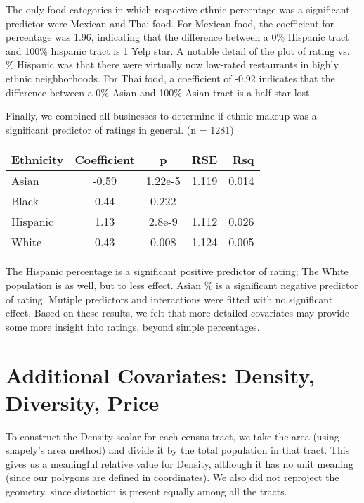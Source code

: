 \documentclass[11pt,twocolumn]{article}
\begin{document}
The only food categories in which respective ethnic percentage was a significant predictor were Mexican and Thai food. For Mexican food, the coefficient for percentage was 1.96, indicating that the difference between a 0\% Hispanic tract and 100\% hispanic tract is 1 Yelp star. A notable detail of the plot of rating vs. \% Hispanic was that there were virtually now low-rated restaurants in highly ethnic neighborhoods. For Thai food, a coefficient of -0.92 indicates that the difference between a 0\% Asian and 100\% Asian tract is a half star lost.

Finally, we combined all businesses to determine if ethnic makeup was a significant predictor of ratings in general. (n = 1281)

\begin{center}
  \begin{tabular}{| l | c | c | c | r | }
    \hline
    Ethnicity & Coefficient & p & RSE & Rsq \\ \hline \hline
    Asian & -0.59 & 1.22e-5 & 1.119 & 0.014 \\ \hline
    Black & 0.44 & 0.222 & - & - \\ \hline
    Hispanic & 1.13 & 2.8e-9 & 1.112 & 0.026 \\ \hline
    White & 0.43 & 0.008 & 1.124 & 0.005 \\ \hline
  \end{tabular}
\end{center}

The Hispanic percentage is a significant positive predictor of rating; The White population is as well, but to less effect. Asian \% is a significant negative predictor of rating. Mutiple predictors and interactions were fitted with no significant effect. Based on these results, we felt that more detailed covariates may provide some more insight into ratings, beyond simple percentages.

\section{Additional Covariates: Density, Diversity, Price}

To construct the Density scalar for each census tract, we take the area (using shapely's area method) and divide it by the total population in that tract. This gives us a meaningful relative value for Density, although it has no unit meaning (since our polygons are defined in coordinates). We also did not reproject the geometry, since distortion is present equally among all the tracts.
\end{document}
